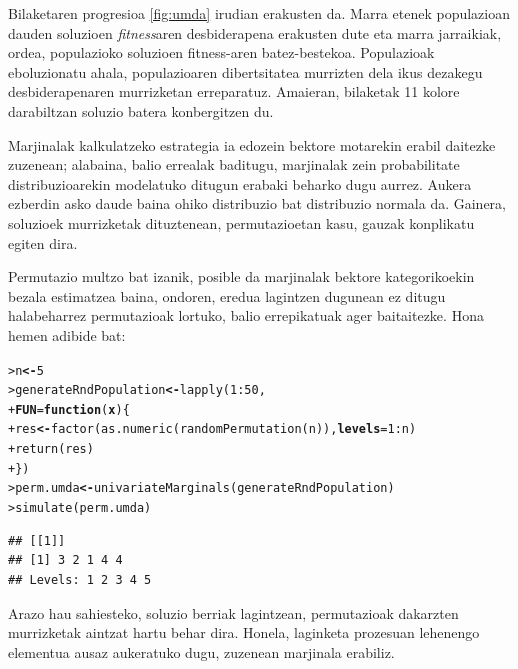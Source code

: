\documentclass[eu]{ifirak}\usepackage[]{graphicx}\usepackage[]{color}
\makeatletter
\newcommand{\hlnum}[1]{\textcolor[rgb]{0.659,0.4,0.051}{#1}}%
\newcommand{\hlopt}[1]{\textcolor[rgb]{0,0,0}{#1}}%
\newcommand{\hlstd}[1]{\textcolor[rgb]{0,0,0}{#1}}%
\newcommand{\hlkwa}[1]{\textcolor[rgb]{0.133,0.224,0.659}{\textbf{#1}}}%
\newcommand{\hlkwb}[1]{\textcolor[rgb]{0.549,0.114,0.412}{\textbf{#1}}}%
\newcommand{\hlkwc}[1]{\textcolor[rgb]{0.659,0.573,0.133}{\textbf{#1}}}%
\newcommand{\hlkwd}[1]{\textcolor[rgb]{0.659,0.133,0.482}{#1}}%
\newenvironment{kframe}{%
 \def\at@end@of@kframe{}%
 \ifinner\ifhmode%
  \def\at@end@of@kframe{\end{minipage}}%
  \begin{minipage}{\columnwidth}%
 \fi\fi%
 \def\FrameCommand##1{\hskip\@totalleftmargin \hskip-\fboxsep
 \colorbox{shadecolor}{##1}\hskip-\fboxsep
     \hskip-\linewidth \hskip-\@totalleftmargin \hskip\columnwidth}%
 \MakeFramed {\advance\hsize-\width
   \@totalleftmargin\z@ \linewidth\hsize
   \@setminipage}}%
 {\par\unskip\endMakeFramed%
 \at@end@of@kframe}
\newenvironment{knitrout}{}{} %
\newcommand{\eng}[1]{\textit{#1}}
\makeatother
\begin{document}
Bilaketaren progresioa \ref{fig:umda} irudian erakusten da. Marra etenek populazioan dauden soluzioen \eng{fitness}aren desbiderapena erakusten dute eta marra jarraikiak, ordea, populazioko soluzioen fitness-aren batez-bestekoa. Populazioak eboluzionatu ahala, populazioaren dibertsitatea murrizten dela ikus dezakegu desbiderapenaren murrizketan erreparatuz. Amaieran, bilaketak 11 kolore darabiltzan soluzio batera konbergitzen du.

Marjinalak kalkulatzeko estrategia ia edozein bektore motarekin erabil daitezke zuzenean; alabaina, balio errealak baditugu, marjinalak zein probabilitate distribuzioarekin modelatuko ditugun erabaki beharko dugu aurrez. Aukera ezberdin asko daude baina ohiko distribuzio bat distribuzio normala da. Gainera, soluzioek murrizketak dituztenean, permutazioetan kasu, gauzak konplikatu egiten dira. 

Permutazio multzo bat izanik, posible da marjinalak bektore kategorikoekin bezala estimatzea baina, ondoren, eredua lagintzen dugunean ez ditugu halabeharrez permutazioak lortuko, balio errepikatuak ager baitaitezke. Hona hemen adibide bat:

\begin{knitrout}
\color{fgcolor}\begin{kframe}
\begin{alltt}
\hlstd{> }\hlstd{n} \hlkwb{<-} \hlnum{5}
\hlstd{> }\hlstd{generateRndPopulation} \hlkwb{<-} \hlkwd{lapply}\hlstd{(}\hlnum{1}\hlopt{:}\hlnum{50}\hlstd{,}
\hlstd{+ }                   \hlkwc{FUN}\hlstd{=}\hlkwa{function}\hlstd{(}\hlkwc{x}\hlstd{) \{}
\hlstd{+ }                     \hlstd{res} \hlkwb{<-} \hlkwd{factor}\hlstd{(}\hlkwd{as.numeric}\hlstd{(}\hlkwd{randomPermutation}\hlstd{(n)),} \hlkwc{levels}\hlstd{=}\hlnum{1}\hlopt{:}\hlstd{n)}
\hlstd{+ }                     \hlkwd{return}\hlstd{(res)}
\hlstd{+ }                   \hlstd{\})}
\hlstd{> }\hlstd{perm.umda} \hlkwb{<-} \hlkwd{univariateMarginals}\hlstd{(generateRndPopulation)}
\hlstd{> }\hlkwd{simulate}\hlstd{(perm.umda)}
\end{alltt}
\begin{verbatim}
## [[1]]
## [1] 3 2 1 4 4
## Levels: 1 2 3 4 5
\end{verbatim}
\end{kframe}
\end{knitrout}

Arazo hau sahiesteko, soluzio berriak lagintzean, permutazioak dakarzten murrizketak aintzat hartu behar dira. Honela, laginketa prozesuan lehenengo elementua ausaz aukeratuko dugu, zuzenean marjinala erabiliz. 
\end{document}
